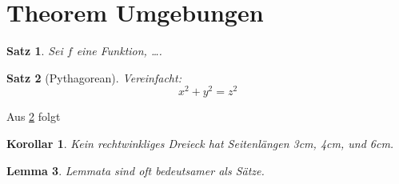\documentclass[a4paper]{amsart}
\newtheorem{theorem}{Satz}[section]
\newtheorem{corollary}{Korollar}[theorem]
\newtheorem{lemma}[theorem]{Lemma}
\begin{document}
\section{Theorem Umgebungen}
\begin{theorem}
    Sei \(f\) eine Funktion, \dots.
\end{theorem}

\begin{theorem}[Pythagorean]
\label{pythagorean}
Vereinfacht:
\[ x^2 + y^2 = z^2 \]
\end{theorem}
    
Aus \ref{pythagorean} folgt    

\begin{corollary}
    Kein rechtwinkliges Dreieck hat Seitenlängen 3cm, 4cm, und 6cm.
\end{corollary}
    

\begin{lemma}
Lemmata sind oft bedeutsamer als Sätze.
\end{lemma}
\end{document}
